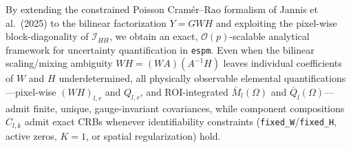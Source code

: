 \documentclass[11pt,a4paper]{article}
\theoremstyle{plain}
\theoremstyle{definition}
\theoremstyle{remark}
\newcommand{\cI}{\mathcal{I}}
\begin{document}
By extending the constrained Poisson Cram\'er--Rao formalism of Jannis et al.\ (2025) to the bilinear factorization $Y = GWH$ and exploiting the pixel-wise block-diagonality of $\cI_{HH}$, we obtain an exact, $\mathcal{O}(p)$-scalable analytical framework for uncertainty quantification in \texttt{espm}. Even when the bilinear scaling/mixing ambiguity $WH = (WA)(A^{-1}H)$ leaves individual coefficients of $W$ and $H$ underdetermined, all physically observable elemental quantifications—pixel-wise $(WH)_{l,r}$ and $Q_{l,r}$, and ROI-integrated $\bar{M}_l(\Omega)$ and $\bar{Q}_l(\Omega)$—admit finite, unique, gauge-invariant covariances, while component compositions $C_{l,k}$ admit exact CRBs whenever identifiability constraints (\texttt{fixed\_W}/\texttt{fixed\_H}, active zeros, $K=1$, or spatial regularization) hold.
\end{document}
